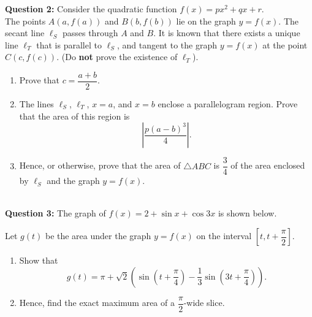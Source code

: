 \documentclass[oneside]{article}[14pt]
\begin{document}
\textbf{Question 2:}
Consider the quadratic function $f(x)=px^2+qx+r$.\\

The points $A(a,f(a))$ and $B(b,f(b))$ lie on the graph $y=f(x)$. The secant line $\ell_S$ passes through $A$ and $B$. It is known that there exists a unique line $\ell_T$ that is parallel to $\ell_S$, and tangent to the graph $y=f(x)$ at the point $C(c,f(c))$. (Do \textbf{not} prove the existence of $\ell_T$).
\begin{enumerate}
	\item[(i)] Prove that $c=\dfrac{a+b}{2}$. \hfill {}
	\item[(ii)] The lines $\ell_S$, $\ell_T$, $x=a$, and $x=b$ enclose a parallelogram region. Prove that the area of this region is \[\left\lvert\frac{p(a-b)^3}{4}\right\rvert.\] \hfill {}
	\item[(iii)] Hence, or otherwise, prove that the area of $\bigtriangleup ABC$ is $\dfrac{3}{4}$ of the area enclosed by $\ell_S$ and the graph $y=f(x)$. \hfill {}
\end{enumerate}
\newpage

\HRule \\
\vskip 4pt
\textbf{Question 3:}
The graph of $f(x)=2+\sin x+\cos 3x$ is shown below.

Let $g(t)$ be the area under the graph $y=f(x)$ on the interval $\left[t,t+\dfrac{\pi}{2}\right].$
\begin{center}
\end{center}
\begin{enumerate}
	\item[(i)] Show that
	      \[g(t)=\pi+\sqrt{2}\left(\sin\left(t+\dfrac{\pi}{4}\right)-\dfrac{1}{3}\sin\left(3t+\dfrac{\pi}{4}\right)\right).\] \hfill {}
	\item[(ii)] Hence, find the exact maximum area of a $\dfrac{\pi}{2}$-wide slice. \hfill {}
\end{enumerate}
\vskip 8pt
\end{document}
